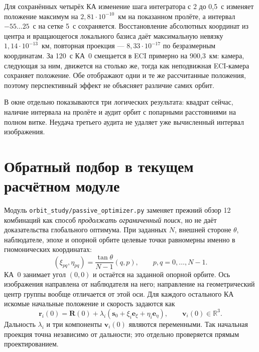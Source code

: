 \documentclass[a4paper,12pt]{article}
\begin{document}
Для сохранённых четырёх КА изменение шага интегратора с 2 до
0{,}5~с изменяет положение максимум на $2{,}81\cdot10^{-10}$~км
на показанном пролёте, а интервал $-55\ldots25$~с на сетке
5~с сохраняется. Восстановление абсолютных координат из
центра и вращающегося локального базиса даёт максимальную
невязку $1{,}14\cdot10^{-13}$~км, повторная проекция ---
$8{,}33\cdot10^{-17}$ по безразмерным координатам.
За 120~с КА~0 смещается в ECI примерно на 900{,}3~км:
камера, следующая за ним, движется на столько же, тогда как
неподвижная ECI-камера сохраняет положение. Обе отображают
одни и те же рассчитанные положения, поэтому перспективный эффект
не объясняет различие самих орбит.

В окне отдельно показываются три логических результата:
квадрат сейчас, наличие интервала на пролёте и аудит орбит с
попарными расстояниями на полном витке. Неудача третьего аудита
не удаляет уже вычисленный интервал изображения.

\section{Обратный подбор в текущем расчётном модуле}

Модуль \texttt{orbit\_study/passive\_optimizer.py} заменяет прежний обзор
12 комбинаций как способ \emph{продолжать ограниченный поиск}, но не даёт
доказательства глобального оптимума. При заданных $N$, внешней стороне
$\theta$, наблюдателе, эпохе и опорной орбите целевые точки равномерны
именно в гномонических координатах:
\begin{equation}
 (\xi_{pq},\eta_{pq})=\frac{\tan\theta}{N-1}(q,p),
 \qquad p,q=0,\ldots,N-1.
\end{equation}
КА~0 занимает угол $(0,0)$ и остаётся на заданной опорной орбите.
Ось изображения направлена от наблюдателя на него; направление на
геометрический центр группы вообще отличается от этой оси. Для каждого
остального КА искомые начальные положение и скорость задаются как
\begin{equation}
 \mathbf r_i(0)=\mathbf R(0)+\lambda_i
 (\mathbf s_0+\xi_i\mathbf e_\xi+\eta_i\mathbf e_\eta),
 \qquad \mathbf v_i(0)\in\mathbb R^3.
\end{equation}
Дальность $\lambda_i$ и три компоненты $\mathbf v_i(0)$ являются
переменными. Так начальная проекция точна независимо от дальности;
это отдельно проверяется прямым проектированием.
\end{document}
